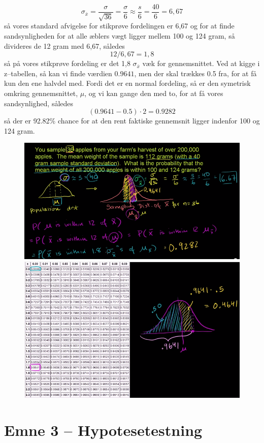 \documentclass[11pt]{article}
\begin{document}
$$\sigma_{\bar{x}}=\frac{\sigma}{\sqrt{36}}=\frac{\sigma}{6}\approx \frac{s}{6}=\frac{40}{6}=6,67$$
så vores standard afvigelse for stikprøve fordelingen er 6,67 og for at finde sandsynligheden for at alle æblers vægt ligger mellem 100 og 124 gram, så divideres de 12 gram med 6,67, således
$$12/6,67=1,8$$
så på vores stikprøve fordeling er det 1,8 $\sigma_{\bar{x}}$ væk for gennemsnittet. Ved at kigge i z--tabellen, så kan vi finde værdien $0.9641$, men der skal trækkes 0.5 fra, for at få kun den ene halvdel med. Fordi det er en normal fordeling, så er den symetrisk omkring gennemsnittet, $\mu$, og vi kan gange den med to, for at få vores sandsynlighed, således
$$(0.9641-0.5)\cdot 2=0.9282$$
så der er 92.82\% chance for at den rent faktiske gennemsnit ligger indenfor 100 og 124 gram. 
\begin{figure}[H]
\centering
\includegraphics[scale=0.5]{img/Selection_004}
\includegraphics[scale=0.5]{img/Selection_003}
\end{figure}

\newpage
\section{Emne 3 -- Hypotesetestning}
\end{document}
